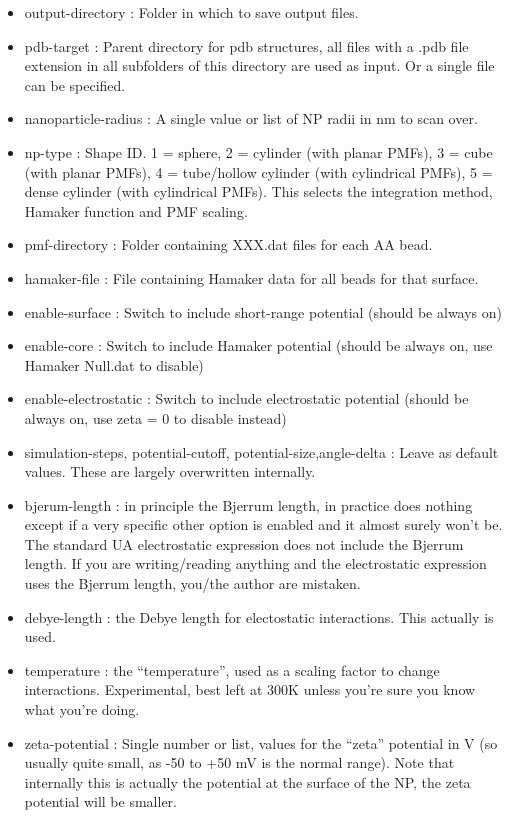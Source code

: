 \documentclass[10pt,a4paper,onecolumn]{report}
\begin{document}
\begin{itemize}
\item output-directory : Folder in which to save output files. 
\item pdb-target : Parent directory for pdb structures, all files with a .pdb file extension  in all subfolders of this directory are used as input. Or a single file can be specified. 
\item nanoparticle-radius : A single value or list of NP radii in nm to scan over.
\item np-type : Shape ID. 1 = sphere, 2 = cylinder (with planar PMFs), 3 = cube (with planar PMFs), 4 = tube/hollow cylinder (with cylindrical PMFs), 5 = dense cylinder (with cylindrical PMFs). This selects the integration method, Hamaker function and PMF scaling.
\item pmf-directory : Folder containing XXX.dat files for each AA bead.
\item hamaker-file : File containing Hamaker data for all beads for that surface.
\item enable-surface : Switch to include short-range potential (should be always on)
\item enable-core : Switch to include Hamaker potential (should be always on, use Hamaker Null.dat to disable)
\item enable-electrostatic : Switch to include electrostatic potential (should be always on, use zeta = 0 to disable instead)
\item simulation-steps, potential-cutoff, potential-size,angle-delta : Leave as default values. These are largely overwritten internally.
\item bjerum-length : in principle the Bjerrum length, in practice does nothing except if a very specific other option is enabled and it almost surely won't be. The standard UA electrostatic expression does not include the Bjerrum length. If you are writing/reading anything and the electrostatic expression uses the Bjerrum length, you/the author are mistaken. 
\item debye-length : the Debye length for electostatic interactions. This actually is used. 
\item temperature : the ``temperature'', used as a scaling factor to change interactions. Experimental, best left at 300K unless you're sure you know what you're doing. 
\item zeta-potential : Single number or list, values for the ``zeta'' potential in V (so usually quite small, as -50 to +50 mV is the normal range). Note that internally this is actually the potential at the surface of the NP, the zeta potential will be smaller. 
\end{itemize}
\end{document}
